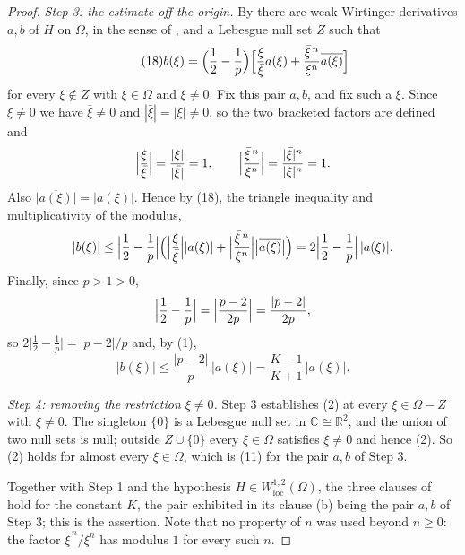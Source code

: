 \begin{proof}
\emph{Step 3: the estimate off the origin.}  By  there are
weak Wirtinger derivatives $a,b$ of $H$ on $\Omega$, in the sense of
, and a Lebesgue null set $Z$ such that
\begin{equation}\tag{18}
  b(\xi)=\Bigl(\frac12-\frac1p\Bigr)
    \Bigl[\frac{\xi}{\bar\xi}a(\xi)+\frac{\bar\xi^{\,n}}{\xi^{n}}
      \overline{a(\xi)}\Bigr]
\end{equation}
for every $\xi\notin Z$ with $\xi\in\Omega$ and $\xi\neq0$.  Fix this pair
$a,b$, and fix such a $\xi$.  Since $\xi\neq0$ we have $\bar\xi\neq0$ and
$|\bar\xi|=|\xi|\neq0$, so the two bracketed factors are defined and
\[
  \Bigl|\frac{\xi}{\bar\xi}\Bigr|=\frac{|\xi|}{|\bar\xi|}=1,\qquad
  \Bigl|\frac{\bar\xi^{\,n}}{\xi^{n}}\Bigr|
    =\frac{|\bar\xi|^{n}}{|\xi|^{n}}=1 .
\]
Also $\bigl|\overline{a(\xi)}\bigr|=|a(\xi)|$.  Hence by (18), the triangle
inequality and multiplicativity of the modulus,
\[
  |b(\xi)|
  \le\Bigl|\frac12-\frac1p\Bigr|
    \Bigl(\Bigl|\frac{\xi}{\bar\xi}\Bigr||a(\xi)|
      +\Bigl|\frac{\bar\xi^{\,n}}{\xi^{n}}\Bigr|
        \bigl|\overline{a(\xi)}\bigr|\Bigr)
  =2\Bigl|\frac12-\frac1p\Bigr|\,|a(\xi)| .
\]
Finally, since $p>1>0$,
\[
  \Bigl|\frac12-\frac1p\Bigr|=\Bigl|\frac{p-2}{2p}\Bigr|=\frac{|p-2|}{2p},
\]
so $2\bigl|\tfrac12-\tfrac1p\bigr|=|p-2|/p$ and, by (1),
\begin{equation}\tag{2}
  |b(\xi)|\le\frac{|p-2|}{p}\,|a(\xi)|
  =\frac{K-1}{K+1}\,|a(\xi)| .
\end{equation}

\emph{Step 4: removing the restriction $\xi\neq0$.}  Step 3 establishes (2) at
every $\xi\in\Omega-Z$ with $\xi\neq0$.  The singleton $\{0\}$ is a Lebesgue
null set in $\mathbb{C}\cong\mathbb{R}^2$, and the union of two null sets is
null; outside $Z\cup\{0\}$ every $\xi\in\Omega$ satisfies $\xi\neq0$ and hence
(2).  So (2) holds for almost every $\xi\in\Omega$, which is (11) for the pair
$a,b$ of Step 3.

Together with Step 1 and the hypothesis $H\in W^{1,2}_{\mathrm{loc}}(\Omega)$,
the three clauses of  hold for the constant $K$, the
pair exhibited in its clause (b) being the pair $a,b$ of Step 3; this is the
assertion.  Note that no property of $n$ was used beyond $n\ge0$: the factor
$\bar\xi^{\,n}/\xi^{n}$ has modulus $1$ for every such $n$.
\end{proof}
